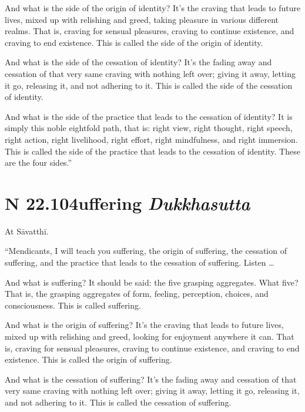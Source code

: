 \documentclass[12pt,openany]{book}%
\newcommand*{\suttatitleacronym}[1]{\smaller[2]{#1}\vspace*{.3em}}
\newcommand*{\suttatitletranslation}[1]{\linebreak{#1}}
\newcommand*{\suttatitleroot}[1]{\linebreak\smaller[2]\itshape{#1}}
\newcommand*{\tocacronym}[1]{\hspace*{-3.3em}{#1}\quad}
\newcommand*{\toctranslation}[1]{#1}
\newcommand*{\tocroot}[1]{(\textit{#1})}
\begin{document}
And what is the side of the origin of identity? It’s the craving that leads to future lives, mixed up with relishing and greed, taking pleasure in various different realms. That is, craving for sensual pleasures, craving to continue existence, and craving to end existence. This is called the side of the origin of identity. 

And what is the side of the cessation of identity? It’s the fading away and cessation of that very same craving with nothing left over; giving it away, letting it go, releasing it, and not adhering to it. This is called the side of the cessation of identity. 

And what is the side of the practice that leads to the cessation of identity? It is simply this noble eightfold path, that is: right view, right thought, right speech, right action, right livelihood, right effort, right mindfulness, and right immersion. This is called the side of the practice that leads to the cessation of identity. These are the four sides.” 

%
\section*{{\suttatitleacronym SN 22.104}{\suttatitletranslation Suffering }{\suttatitleroot Dukkhasutta}}
\addcontentsline{toc}{section}{\tocacronym{SN 22.104} \toctranslation{Suffering } \tocroot{Dukkhasutta}}

At \textsanskrit{Sāvatthī}. 

“Mendicants, I will teach you suffering, the origin of suffering, the cessation of suffering, and the practice that leads to the cessation of suffering. Listen … 

And what is suffering? It should be said: the five grasping aggregates. What five? That is, the grasping aggregates of form, feeling, perception, choices, and consciousness. This is called suffering. 

And what is the origin of suffering? It’s the craving that leads to future lives, mixed up with relishing and greed, looking for enjoyment anywhere it can. That is, craving for sensual pleasures, craving to continue existence, and craving to end existence. This is called the origin of suffering. 

And what is the cessation of suffering? It’s the fading away and cessation of that very same craving with nothing left over; giving it away, letting it go, releasing it, and not adhering to it. This is called the cessation of suffering. 
\end{document}

